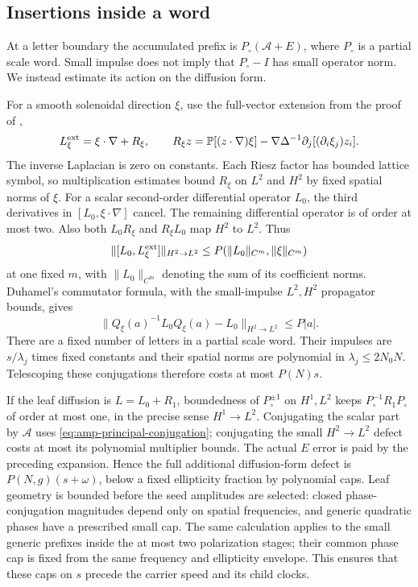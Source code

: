 \documentclass[11pt,a4paper]{amsart}
\theoremstyle{definition}
\theoremstyle{remark}
\numberwithin{equation}{section}
\newcommand{\PP}{\mathbb P}
\newcommand{\norm}[1]{\lVert #1\rVert}
\begin{document}
\subsection{Insertions inside a word}
At a letter boundary the accumulated prefix is
$P_\circ(\mathcal A+E)$, where $P_\circ$ is a partial scale word.
Small impulse does not imply that $P_\circ-I$ has small operator norm.
We instead estimate its action on the diffusion form.

For a smooth solenoidal direction $\xi$, use the full-vector extension
from the proof of \cite[Lemma~8.2]{Common},
\[
 L_\xi^{\rm ext}=\xi\cdot\nabla+R_\xi,\qquad
 R_\xi z=\PP[(z\cdot\nabla)\xi]
 -\nabla\Delta^{-1}\partial_j[(\partial_i\xi_j)z_i].
\]
The inverse Laplacian is zero on constants. Each Riesz factor has
bounded lattice symbol, so multiplication estimates bound $R_\xi$
on $L^2$ and $H^2$ by fixed spatial norms of $\xi$.
For a scalar second-order differential operator $L_0$, the third
derivatives in $[L_0,\xi\cdot\nabla]$ cancel. The remaining differential
operator is of order at most two. Also both $L_0R_\xi$ and $R_\xi L_0$
map $H^2$ to $L^2$. Thus
\[
 \norm{[L_0,L_\xi^{\rm ext}]}_{H^2\to L^2}
 \le P(\norm{L_0}_{C^m},\norm\xi_{C^m})
\]
at one fixed $m$, with $\norm{L_0}_{C^m}$ denoting the sum of its
coefficient norms. Duhamel's commutator formula, with the small-impulse
$L^2,H^2$ propagator bounds, gives
\[
 \norm{Q_\xi(a)^{-1}L_0Q_\xi(a)-L_0}_{H^2\to L^2}
 \le P|a|.
\]
There are a fixed number of letters in a partial scale word.
Their impulses are $s/\lambda_j$ times fixed constants and their
spatial norms are polynomial in $\lambda_j\le2N_0N$.
Telescoping these conjugations therefore costs at most $P(N)s$.

If the leaf diffusion is $L=L_0+R_1$, boundedness of $P_\circ^{\pm1}$
on $H^1,L^2$ keeps $P_\circ^{-1}R_1P_\circ$ of order at most one,
in the precise sense $H^1\to L^2$. Conjugating the scalar part by
$\mathcal A$ uses \eqref{eq:amp-principal-conjugation}; conjugating the
small $H^2\to L^2$ defect costs at most its polynomial multiplier bounds.
The actual $E$ error is paid by the preceding expansion.
Hence the full additional diffusion-form defect is
$P(N,g)(s+\omega)$, below a fixed ellipticity fraction by polynomial caps.
Leaf geometry is bounded before the seed amplitudes are selected:
closed phase-conjugation magnitudes depend only on spatial frequencies,
and generic quadratic phases have a prescribed small cap.
The same calculation applies to the small generic prefixes inside
the at most two polarization stages; their common phase cap is fixed
from the same frequency and ellipticity envelope.
This ensures that these caps on $s$ precede the carrier speed and its
child clocks.
\end{document}
